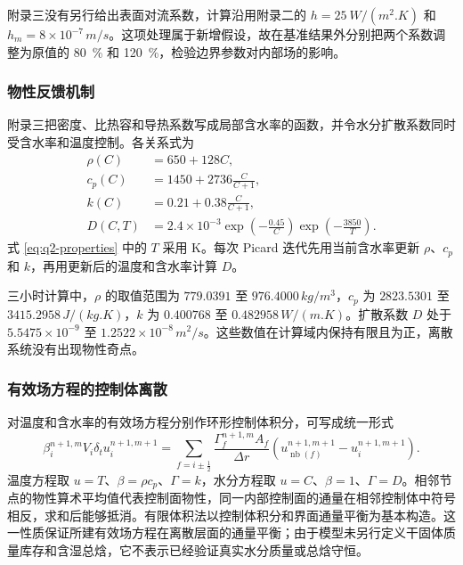 \documentclass[withoutpreface,bwprint]{cumcmthesis}
\begin{document}
附录三没有另行给出表面对流系数，计算沿用附录二的 \(h=\SI{25}{W/(m^2.K)}\) 和 \(h_m=8\times10^{-7}\,\si{m/s}\)。这项处理属于新增假设，故在基准结果外分别把两个系数调整为原值的 \SI{80}{\percent} 和 \SI{120}{\percent}，检验边界参数对内部场的影响。

\subsubsection{物性反馈机制}

附录三把密度、比热容和导热系数写成局部含水率的函数，并令水分扩散系数同时受含水率和温度控制。各关系式为
\begin{align}
\rho(C)&=650+128C,\label{eq:q2-rho}\\
c_p(C)&=1450+2736\frac{C}{C+1},\label{eq:q2-cp}\\
k(C)&=0.21+0.38\frac{C}{C+1},\label{eq:q2-k}\\
D(C,T)&=2.4\times10^{-3}
\exp\left(-\frac{0.45}{C}\right)
\exp\left(-\frac{3850}{T}\right).
\label{eq:q2-properties}
\end{align}
式 \ref{eq:q2-properties} 中的 \(T\) 采用 K。每次 Picard 迭代先用当前含水率更新 \(\rho\)、\(c_p\) 和 \(k\)，再用更新后的温度和含水率计算 \(D\)。

三小时计算中，\(\rho\) 的取值范围为 \(779.0391\) 至 \(976.4000\,\si{kg/m^3}\)，\(c_p\) 为 \(2823.5301\) 至 \(3415.2958\,\si{J/(kg.K)}\)，\(k\) 为 \(0.400768\) 至 \(0.482958\,\si{W/(m.K)}\)。扩散系数 \(D\) 处于 \(5.5475\times10^{-9}\) 至 \(1.2522\times10^{-8}\,\si{m^2/s}\)。这些数值在计算域内保持有限且为正，离散系统没有出现物性奇点。

\subsubsection{有效场方程的控制体离散}

对温度和含水率的有效场方程分别作环形控制体积分，可写成统一形式
\begin{equation}
\beta_i^{n+1,m}V_i\delta_t u_i^{n+1,m+1}
=
\sum_{f=i\pm\frac{1}{2}}
\frac{\Gamma_f^{n+1,m}A_f}{\Delta r}
\left(
u_{\operatorname{nb}(f)}^{n+1,m+1}
-u_i^{n+1,m+1}
\right).
\label{eq:q2-fvm-unified}
\end{equation}
温度方程取 \(u=T\)、\(\beta=\rho c_p\)、\(\Gamma=k\)，水分方程取 \(u=C\)、\(\beta=1\)、\(\Gamma=D\)。相邻节点的物性算术平均值代表控制面物性，同一内部控制面的通量在相邻控制体中符号相反，求和后能够抵消。有限体积法以控制体积分和界面通量平衡为基本构造\cite{eymard2000}。这一性质保证所建有效场方程在离散层面的通量平衡；由于模型未另行定义干固体质量库存和含湿总焓，它不表示已经验证真实水分质量或总焓守恒。
\end{document}
